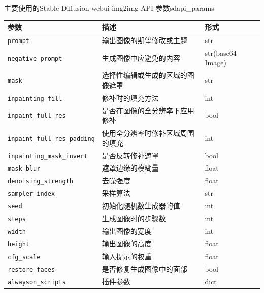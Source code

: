\documentclass[a4paper,AutoFakeBold,oneside,12pt]{book}
\begin{document}
\begin{bupttable}{主要使用的Stable Diffusion webui img2img API 参数}{sdapi_params}
    \begin{tabular}{|l|l|l|}
        \hline \textbf{参数} & \textbf{描述} & \textbf{形式} \\
        \hline \texttt{prompt} & 输出图像的期望修改或主题 & str \\
        \hline \texttt{negative\_prompt} & 生成图像中应避免的内容 & str(base64 Image) \\
        \hline \texttt{mask} & 选择性编辑或生成的区域的图像遮罩 & str \\
        \hline \texttt{inpainting\_fill} & 修补时的填充方法 & int \\
        \hline \texttt{inpaint\_full\_res} & 是否在图像的全分辨率下应用修补 & bool \\
        \hline \texttt{inpaint\_full\_res\_padding} & 使用全分辨率时修补区域周围的填充 & int \\
        \hline \texttt{inpainting\_mask\_invert} & 是否反转修补遮罩 & bool \\
        \hline \texttt{mask\_blur} & 遮罩边缘的模糊量 & float \\
        \hline \texttt{denoising\_strength} & 去噪强度 & float \\
        \hline \texttt{sampler\_index} & 采样算法 & str \\
        \hline \texttt{seed} & 初始化随机数生成器的值 & int \\
        \hline \texttt{steps} & 生成图像时的步骤数 & int \\
        \hline \texttt{width} & 输出图像的宽度 & int \\
        \hline \texttt{height} & 输出图像的高度 & float \\
        \hline \texttt{cfg\_scale} & 输入提示的权重 & float \\
        \hline \texttt{restore\_faces} & 是否修复生成图像中的面部 & bool \\
        \hline \texttt{alwayson\_scripts} & 插件参数 & dict \\
        \hline
    \end{tabular}
\end{bupttable}
\newpage
\end{document}
